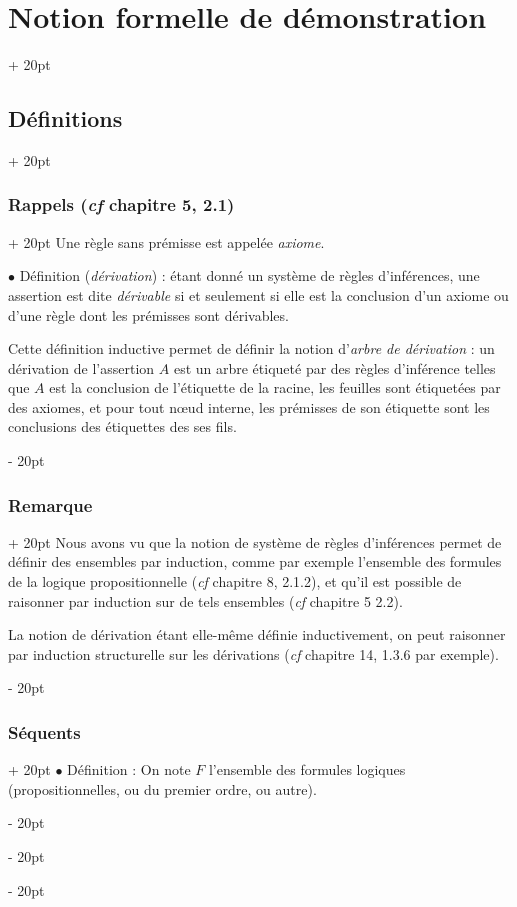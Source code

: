 \documentclass[a4paper, 12pt, twoside]{article}
\newcommand{\ind}[1][20pt]{\advance\leftskip + #1}
\newcommand{\deind}[1][20pt]{\advance\leftskip - #1}
\newenvironment{indt}[2][20pt]{#2 \par \ind[#1]}{\par \deind} %
\begin{document}
\begin{indt}{\section{Notion formelle de démonstration}}
\begin{indt}{\subsection{Définitions}}
\begin{indt}{\subsubsection{Rappels (\textit{cf} chapitre 5, 2.1)}}
                Une règle sans prémisse est appelée \emph{axiome}.

                \vspace{12pt}
                
                $\bullet$ Définition (\emph{dérivation}) : étant donné un système de règles d'inférences, une assertion est dite \emph{dérivable} si et seulement si elle est la conclusion d'un axiome ou d'une règle dont les prémisses sont dérivables.

                Cette définition inductive permet de définir la notion d'\emph{arbre de dérivation} : un dérivation de l'assertion $A$ est un arbre étiqueté par des règles d'inférence telles que $A$ est la conclusion de l'étiquette de la racine, les feuilles sont étiquetées par des axiomes, et pour tout n\oe ud interne, les prémisses de son étiquette sont les conclusions des étiquettes des ses fils.
            \end{indt}

            \vspace{12pt}
            
            \begin{indt}{\subsubsection{Remarque}}
                Nous avons vu que la notion de système de règles d'inférences permet de définir des ensembles par induction, comme par exemple l'ensemble des formules de la logique propositionnelle (\textit{cf} chapitre 8, 2.1.2), et qu'il est possible de raisonner par induction sur de tels ensembles (\textit{cf} chapitre 5 2.2).

                La notion de dérivation étant elle-même définie inductivement, on peut raisonner par induction structurelle sur les dérivations (\textit{cf} chapitre 14, 1.3.6 par exemple).
            \end{indt}

            \vspace{12pt}
            
            \begin{indt}{\subsubsection{Séquents}}
                $\bullet$ Définition : On note $F$ l'ensemble des formules logiques (propositionnelles, ou du premier ordre, ou autre).


\end{indt}
\end{indt}
\end{indt}
\end{document}
